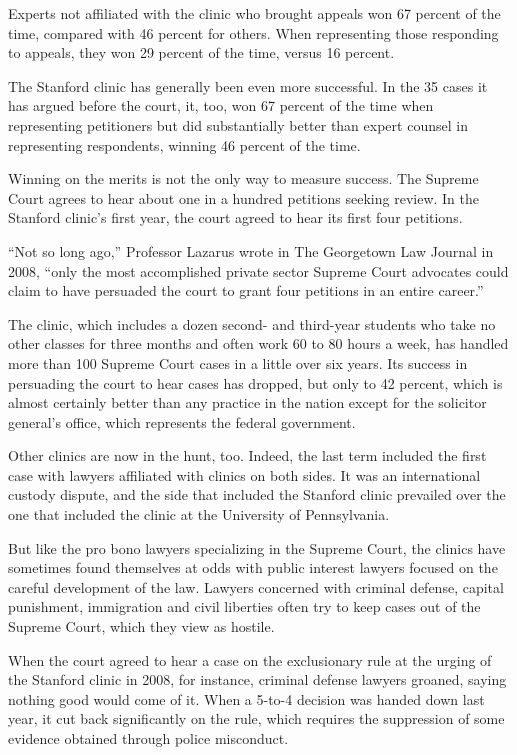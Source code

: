 ﻿\documentclass[12pt]{article}
\begin{document}
Experts not affiliated with the clinic who brought appeals won 67 percent of the time, compared with
46 percent for others. When representing those responding to appeals, they won 29 percent of the
time, versus 16 percent.

The Stanford clinic has generally been even more successful. In the 35 cases it has argued before
the court, it, too, won 67 percent of the time when representing petitioners but did substantially
better than expert counsel in representing respondents, winning 46 percent of the time.

Winning on the merits is not the only way to measure success. The Supreme Court agrees to hear about
one in a hundred petitions seeking review. In the Stanford clinic's first year, the court agreed to
hear its first four petitions.

``Not so long ago,'' Professor Lazarus wrote in The Georgetown Law Journal in 2008, ``only the most
accomplished private sector Supreme Court advocates could claim to have persuaded the court to grant
four petitions in an entire career.''

The clinic, which includes a dozen second- and third-year students who take no other classes for
three months and often work 60 to 80 hours a week, has handled more than 100 Supreme Court cases in
a little over six years. Its success in persuading the court to hear cases has dropped, but only to
42 percent, which is almost certainly better than any practice in the nation except for the
solicitor general's office, which represents the federal government.

Other clinics are now in the hunt, too. Indeed, the last term included the first case with lawyers
affiliated with clinics on both sides. It was an international custody dispute, and the side that
included the Stanford clinic prevailed over the one that included the clinic at the University of
Pennsylvania.

But like the pro bono lawyers specializing in the Supreme Court, the clinics have sometimes found
themselves at odds with public interest lawyers focused on the careful development of the law.
Lawyers concerned with criminal defense, capital punishment, immigration and civil liberties often
try to keep cases out of the Supreme Court, which they view as hostile.

When the court agreed to hear a case on the exclusionary rule at the urging of the Stanford clinic
in 2008, for instance, criminal defense lawyers groaned, saying nothing good would come of it. When
a 5-to-4 decision was handed down last year, it cut back significantly on the rule, which requires
the suppression of some evidence obtained through police misconduct.
\end{document}

